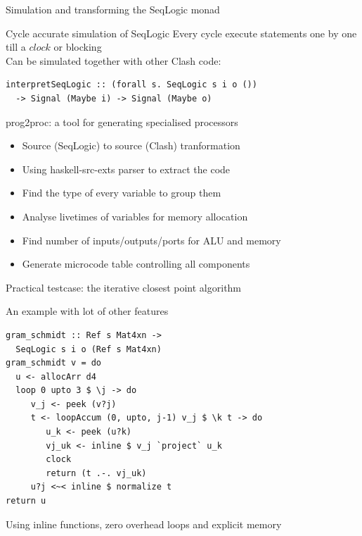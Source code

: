 \documentclass[pdf]{beamer}
\begin{document}
\begin{frame}[fragile]{Simulation and transforming the SeqLogic monad}
\begin{block}{Cycle accurate simulation of SeqLogic}
Every cycle execute statements one by one till a $clock$ or blocking \\
Can be simulated together with other Clash code:
\begin{verbatim}
interpretSeqLogic :: (forall s. SeqLogic s i o ())
  -> Signal (Maybe i) -> Signal (Maybe o)
\end{verbatim}
\end{block}

\begin{block}{prog2proc: a tool for generating specialised processors}
\begin{itemize}
\item Source (SeqLogic) to source (Clash) tranformation
\item Using haskell-src-exts parser to extract the code
\item Find the type of every variable to group them
\item Analyse livetimes of variables for memory allocation
\item Find number of inputs/outputs/ports for ALU and memory
\item Generate microcode table controlling all components
\end{itemize}
\end{block}

\end{frame}

\begin{frame}{Practical testcase: the iterative closest point algorithm}

\end{frame}


\begin{frame}[fragile]{An example with lot of other features}
\begin{block}{}
\begin{verbatim}
gram_schmidt :: Ref s Mat4xn -> 
  SeqLogic s i o (Ref s Mat4xn)
gram_schmidt v = do
  u <- allocArr d4
  loop 0 upto 3 $ \j -> do
     v_j <- peek (v?j)
     t <- loopAccum (0, upto, j-1) v_j $ \k t -> do
        u_k <- peek (u?k)
        vj_uk <- inline $ v_j `project` u_k
        clock
        return (t .-. vj_uk)
     u?j <~< inline $ normalize t
return u
\end{verbatim}
\end{block}

\begin{block}{}
Using inline functions, zero overhead loops and explicit memory
\end{block}

\end{frame}
\end{document}
